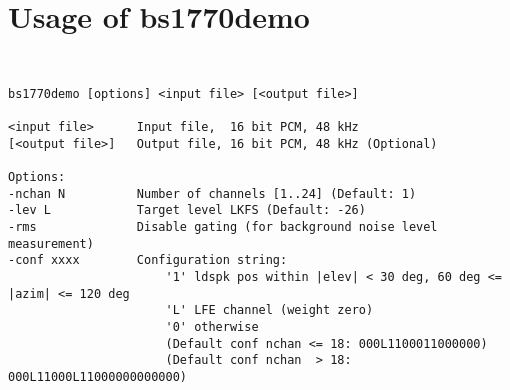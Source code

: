 \section{Usage of bs1770demo}

{\tt\small
\begin{verbatim}
bs1770demo [options] <input file> [<output file>]

<input file>      Input file,  16 bit PCM, 48 kHz
[<output file>]   Output file, 16 bit PCM, 48 kHz (Optional)

Options:
-nchan N          Number of channels [1..24] (Default: 1)
-lev L            Target level LKFS (Default: -26)
-rms              Disable gating (for background noise level measurement)
-conf xxxx        Configuration string:
                      '1' ldspk pos within |elev| < 30 deg, 60 deg <= |azim| <= 120 deg
                      'L' LFE channel (weight zero)
                      '0' otherwise
                      (Default conf nchan <= 18: 000L1100011000000)
                      (Default conf nchan  > 18: 000L11000L11000000000000)
\end{verbatim}
}
